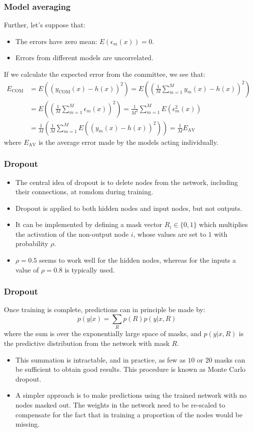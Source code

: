 \documentclass{beamer}
\begin{document}
\begin{frame}
    \frametitle{Model averaging}
    Further, let's suppose that:
    \begin{itemize}
        \item The errors have zero mean: $E(\epsilon_m(x))=0$.
        \item Errors from different models are uncorrelated.
    \end{itemize}
    If we calculate the expected error from the committee, we see that:
    \begin{align*}
        E_{\textrm{COM}}&=E((y_{\textrm{COM}}(x)-h(x))^{2})=E((\frac{1}{M}\sum_{m=1}^{M}y_{m}(x)-h(x))^{2}) \\
        &=E((\frac{1}{M}\sum_{m=1}^{M}\epsilon_{m}(x))^{2})=\frac{1}{M^{2}}\sum_{m=1}^{M}E(\epsilon^{2}_m(x)) \\
        &=\frac{1}{M}(\frac{1}{M}\sum_{m=1}^{M}E((y_{m}(x)-h(x))^{2}))=\frac{1}{M}E_{\textrm{AV}}
    \end{align*}
    where $E_{\textrm{AV}}$ is the average error made by the models acting individually.
\end{frame}

\begin{frame}
    \frametitle{Dropout}
    \begin{itemize}
        \item The central idea of dropout is to delete nodes from the network, including their connections, at romdom during training.
        \item Dropout is applied to both hidden nodes and input nodes, but not outputs.
        \item It can be implemented by defining a mask vector $R_{i}\in\{0,1\}$ which multiplies the activation of the non-output node $i$, whose values are set to $1$ with probability $\rho$.
        \item $\rho=0.5$ seems to work well for the hidden nodes, whereas for the inputs a value of $\rho=0.8$ is typically used.
    \end{itemize}
\end{frame}

\begin{frame}
    \frametitle{Dropout}
    Once training is complete, predictions can in principle be made by:
    \begin{equation*}
        p(y|x)=\sum_{R}p(R)p(y|x,R)
    \end{equation*}
    where the sum is over the exponentially large space of masks, and $p(y|x,R)$ is the predictive distribution from the network with mask $R$.
    \begin{itemize}
        \item This summation is intractable, and in practice, as few as $10$ or $20$ masks can be sufficient to obtain good results. This procedure is known as Monte Carlo dropout.
        \item A simpler approach is to make predictions using the trained network with no nodes masked out. The weights in the network need to be re-scaled to compensate for the fact that in training a proportion of the nodes would be missing.
    \end{itemize}
\end{frame}
\end{document}
